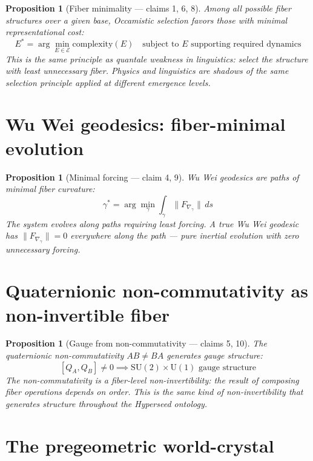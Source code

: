 \documentclass[11pt,a4paper]{article}
\newtheorem{proposition}[definition]{Proposition}
\begin{document}
\begin{proposition}[Fiber minimality --- claims 1, 6, 8]
\label{prop:occam}
Among all possible fiber structures over a given base, Occamistic
selection favors those with minimal representational cost:
\[
  E^* = \arg\min_{E \in \mathcal{E}} \text{complexity}(E)
    \quad \text{subject to } E \text{ supporting required dynamics}
\]
This is the same principle as quantale weakness in linguistics:
select the structure with least unnecessary fiber. Physics and
linguistics are shadows of the same selection principle applied
at different emergence levels.
\end{proposition}

\section{Wu Wei geodesics: fiber-minimal evolution}

\begin{proposition}[Minimal forcing --- claim 4, 9]
\label{prop:wuwei}
Wu Wei geodesics are paths of minimal fiber curvature:
\[
  \gamma^* = \arg\min_\gamma \int_\gamma \|F_{\nabla_\gamma}\|\, ds
\]
The system evolves along paths requiring least forcing. A true Wu Wei
geodesic has $\|F_{\nabla_\gamma}\| = 0$ everywhere along the path ---
pure inertial evolution with zero unnecessary forcing.
\end{proposition}

\section{Quaternionic non-commutativity as non-invertible fiber}

\begin{proposition}[Gauge from non-commutativity --- claims 5, 10]
\label{prop:quaternion}
The quaternionic non-commutativity $AB \neq BA$ generates gauge
structure:
\[
  [Q_A, Q_B] \neq 0 \implies \text{SU}(2) \times \text{U}(1)
    \text{ gauge structure}
\]
The non-commutativity is a fiber-level non-invertibility: the result
of composing fiber operations depends on order. This is the same kind
of non-invertibility that generates structure throughout the Hyperseed
ontology.
\end{proposition}


\section{The pregeometric world-crystal}
\label{sec:crystal}
\end{document}
